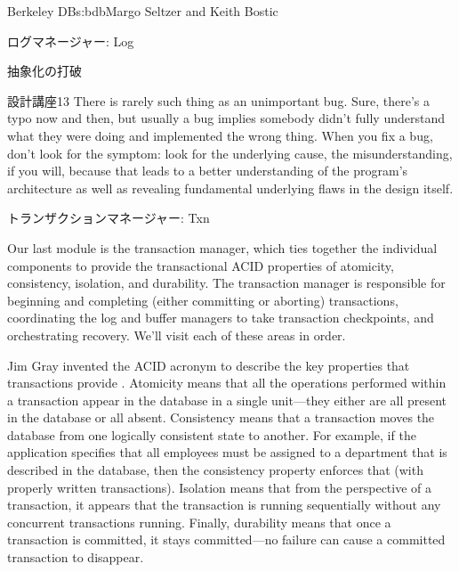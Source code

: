 \begin{aosachapter}{Berkeley DB}{s:bdb}{Margo Seltzer and Keith Bostic}
\begin{aosasect1}{ログマネージャー: Log}
\begin{aosasect2}{抽象化の打破}
\begin{aosabox}{設計講座13}
There is rarely such thing as an unimportant bug. Sure, there's a typo
now and then, but usually a bug implies somebody didn't fully
understand what they were doing and implemented the wrong thing.
When you fix a bug, don't look for the symptom: look for the
underlying cause, the misunderstanding, if you will, because that
leads to a better understanding of the program's architecture as well
as revealing fundamental underlying flaws in the design itself.

\end{aosabox}

\end{aosasect2}

\end{aosasect1}

\begin{aosasect1}{トランザクションマネージャー: Txn}

Our last module is the transaction manager, which ties together the
individual components to provide the transactional ACID properties of
atomicity, consistency, isolation, and durability. The transaction
manager is responsible for beginning and completing (either committing
or aborting) transactions, coordinating the log and buffer managers to
take transaction checkpoints, and orchestrating recovery. We'll visit
each of these areas in order.


Jim Gray invented the ACID acronym to
describe the key properties that transactions provide \cite{bib:gray:trans}.  Atomicity
means that all the operations performed within a transaction appear in
the database in a single unit---they either are all present in the
database or all absent. Consistency means that a transaction moves the
database from one logically consistent state to another. For example,
if the application specifies that all employees must be assigned to a
department that is described in the database, then the consistency
property enforces that (with properly written transactions). Isolation
means that from the perspective of a transaction, it appears that the
transaction is running sequentially without any concurrent
transactions running. Finally, durability means that once a
transaction is committed, it stays committed---no failure can cause a
committed transaction to disappear.


\end{aosasect1}
\end{aosachapter}
